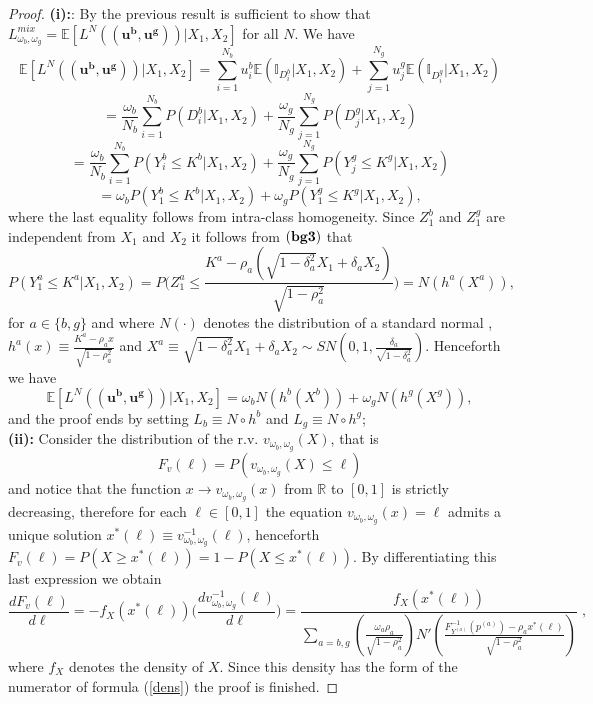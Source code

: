 \documentclass[preprint,12pt]{article}
\newcommand{\E}{\mathbb{E}}
\begin{document}
\begin{proof}
 {\bf{(i):}}: By the previous result is sufficient to show that $L^{mix}_{\omega_b,\omega_g}=\E[L^N(\mathbf{(u^b,u^g)}) | X_1, X_2 ]$ for all $N$. We have
$$
\E[L^N(\mathbf{(u^b,u^g)}) | X_1, X_2 ]=\sum_{i=1}^{N_b}u^b_i\E(\mathbb{I}_{D^b_i}|X_1,X_2)+\sum_{j=1}^{N_g}u^g_j\E(\mathbb{I}_{D^g_i}|X_1,X_2)
$$
$$
=\frac{\omega_b}{N_b}\sum_{i=1}^{N_b}P(D^b_i|X_1,X_2)+\frac{\omega_g}{N_g}\sum_{j=1}^{N_g}P({D^g_j}|X_1,X_2)
$$
$$
=\frac{\omega_b}{N_b}\sum_{i=1}^{N_b}P(Y_i^b\leq K^b|X_1,X_2)+\frac{\omega_g}{N_g}\sum_{j=1}^{N_g}P(Y_j^g\leq K^g|X_1,X_2)
$$
$$
={\omega_b}P(Y_1^b\leq K^b|X_1,X_2)+{\omega_g}P(Y_1^g\leq K^g|X_1,X_2),
$$
where the last equality follows from intra-class homogeneity. Since $Z_1^b$ and $Z_1^g$ are independent from $X_1$ and $X_2$ it follows from ${\bf{(bg3)}}$ that
$$
P(Y_1^a\leq K^a|X_1,X_2)=P\biggl(Z_1^a\leq \frac{K^a-\rho_a(\sqrt{1-\delta^2_a}X_1+\delta_aX_2)}{\sqrt{1-\rho^2_a}}\biggr)=N(h^a(X^a)),
$$
for $a\in \{b,g\}$ and where $N(\cdot)$ denotes the distribution of a standard normal , $h^a(x)\equiv \frac{K^a-\rho_a x}{\sqrt{1-\rho^2_a}}$ and $X^a \equiv \sqrt{1-\delta^2_a} X_1+\delta_a X_2 \sim SN(0,1,\frac{\delta_a}{\sqrt{1-\delta_a^2}})$. Henceforth we have
$$
\E[L^N(\mathbf{(u^b,u^g)}) | X_1, X_2 ]={\omega_b}N(h^b(X^b))+{\omega_g}N(h^g(X^g)),
$$
and the proof ends by setting $L_b\equiv N\circ h^b$ and $L_g\equiv N\circ h^g$; \\
 {\bf{(ii):}} Consider the distribution of the r.v. $v_{\omega_b,\omega_g}(X)$, that is 
 $$
 F_v(\ell)=P(v_{\omega_b,\omega_g}(X)\leq \ell)
 $$
 and notice that the function $x\to v_{\omega_b,\omega_g}(x)$ from  $\mathbb{R}$ to $[0,1]$ is strictly decreasing, therefore for each $\ell\in[0,1]$ the equation $v_{\omega_b,\omega_g}(x)=\ell$ admits a unique solution $x^*(\ell)\equiv v_{\omega_b,\omega_g}^{-1}(\ell)$, henceforth $F_v(\ell)=P(X\geq x^*(\ell))=1-P(X\leq x^*(\ell))$. By differentiating this last expression we obtain 
 $$
 \frac{d F_v(\ell)}{d\ell}=-f_X(x^*(\ell))\bigg(\frac{dv_{\omega_b,\omega_g}^{-1}(\ell)}{d\ell}\bigg)=\frac{f_X(x^*(\ell))}{\sum_{a = b,g}\left(\frac{\omega_a\rho_a}{\sqrt{1-\rho_a^2}}\right)N'\left(\frac{F_{Y^{(a)}}^{-1}(p^{(a)})-\rho_a x^*(\ell)}{\sqrt{1-\rho_a^2}} \right) }\;,
 $$
where $f_X$ denotes the density of $X$. Since this density has the form of the numerator of formula (\ref{dens}) the proof is finished.
\end{proof}
\end{document}
